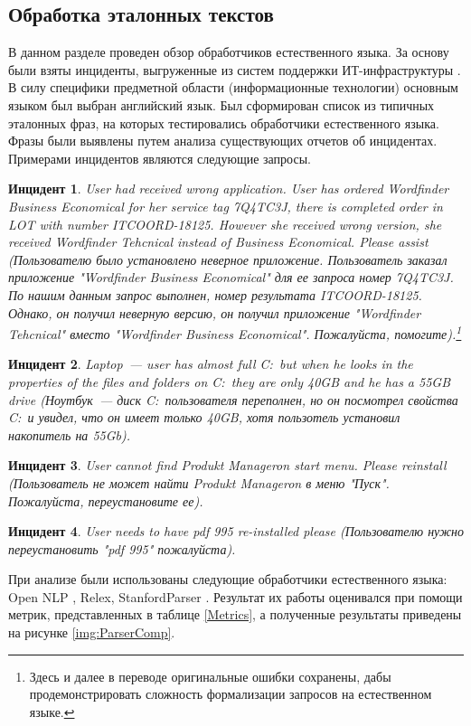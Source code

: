 \subsection{Обработка эталонных текстов} \label{sect2_1}
В данном разделе проведен обзор обработчиков естественного языка. За основу были взяты инциденты, выгруженные из систем поддержки ИТ-инфраструктуры \icl. В силу специфики предметной области (информационные технологии) основным языком был выбран английский язык. Был сформирован список из типичных эталонных фраз, на которых тестировались обработчики естественного языка. Фразы были выявлены путем анализа существующих отчетов об инцидентах. Примерами инцидентов являются следующие запросы.\par
\textbf{Инцидент 1}.
\textit{
User had received wrong application. User has ordered Wordfinder Business Economical for her service tag 7Q4TC3J, there is completed order in LOT with number ITCOORD-18125. However she received wrong version, she received Wordfinder Tehcnical instead of Business Economical. Please assist (Пользователю было установлено неверное приложение. Пользователь заказал приложение "Wordfinder Business Economical" для ее запроса номер 7Q4TC3J. По нашим данным запрос выполнен, номер результата ITCOORD-18125. Однако, он получил неверную версию, он получил приложение "Wordfinder Tehcnical" вместо "Wordfinder Business Economical". Пожалуйста, помогите).\footnote{Здесь и далее в переводе оригинальные ошибки сохранены, дабы продемонстрировать сложность формализации запросов на естественном языке.}
}\par
\textbf{Инцидент 2}.
\textit{
Laptop~--- user has almost full C:\ but when he looks in the properties of the files and folders on C:\ they are only 40GB and he has a 55GB drive (Ноутбук~--- диск C:\ пользователя переполнен, но он посмотрел свойства C:\ и увидел, что он имеет только 40GB, хотя пользотель установил накопитель на 55Gb).
}\par
\textbf{Инцидент 3}.
\textit{
User cannot find Produkt Manageron start menu. Please reinstall (Пользователь не может найти Produkt Manageron в меню "Пуск". Пожалуйста, переустановите ее). 
}\par
\textbf{Инцидент 4}.
\textit{
User needs to have pdf 995 re-installed please (Пользователю нужно переустановить "pdf 995" пожалуйста).
}\par

При анализе были использованы следующие обработчики естественного языка: Open NLP \cite{OpenNLP}, Relex\cite{OpenCogRelex}, StanfordParser \cite{StanfordParser}. Результат их работы оценивался при помощи метрик, представленных в таблице \ref{Metrics}, а полученные результаты приведены на рисунке \ref{img:ParserComp}. 

